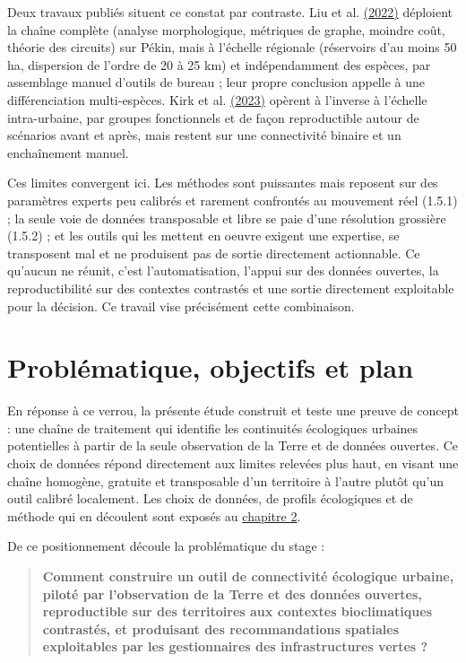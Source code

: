 \documentclass[a4paper,11pt]{report}
\begin{document}
Deux travaux publiés situent ce constat par contraste. Liu et al. \hyperref[sec:bibliographie]{(2022)} déploient la chaîne complète (analyse morphologique, métriques de graphe, moindre coût, théorie des circuits) sur Pékin, mais à l'échelle régionale (réservoirs d'au moins 50 ha, dispersion de l'ordre de 20 à 25 km) et indépendamment des espèces, par assemblage manuel d'outils de bureau ; leur propre conclusion appelle à une différenciation multi-espèces. Kirk et al. \hyperref[sec:bibliographie]{(2023)} opèrent à l'inverse à l'échelle intra-urbaine, par groupes fonctionnels et de façon reproductible autour de scénarios avant et après, mais restent sur une connectivité binaire et un enchaînement manuel.

Ces limites convergent ici. Les méthodes sont puissantes mais reposent sur des paramètres experts peu calibrés et rarement confrontés au mouvement réel (1.5.1) ; la seule voie de données transposable et libre se paie d'une résolution grossière (1.5.2) ; et les outils qui les mettent en oeuvre exigent une expertise, se transposent mal et ne produisent pas de sortie directement actionnable. Ce qu'aucun ne réunit, c'est l'automatisation, l'appui sur des données ouvertes, la reproductibilité sur des contextes contrastés et une sortie directement exploitable pour la décision. Ce travail vise précisément cette combinaison.

\section{Problématique, objectifs et plan}\label{sec:1.6}

En réponse à ce verrou, la présente étude construit et teste une preuve de concept : une chaîne de traitement qui identifie les continuités écologiques urbaines potentielles à partir de la seule observation de la Terre et de données ouvertes. Ce choix de données répond directement aux limites relevées plus haut, en visant une chaîne homogène, gratuite et transposable d'un territoire à l'autre plutôt qu'un outil calibré localement. Les choix de données, de profils écologiques et de méthode qui en découlent sont exposés au \hyperref[chap:2]{chapitre 2}.

De ce positionnement découle la problématique du stage :

\begin{quote}
\textbf{Comment construire un outil de connectivité écologique urbaine, piloté par l'observation de la Terre et des données ouvertes, reproductible sur des territoires aux contextes bioclimatiques contrastés, et produisant des recommandations spatiales exploitables par les gestionnaires des infrastructures vertes ?}
\end{quote}
\end{document}
